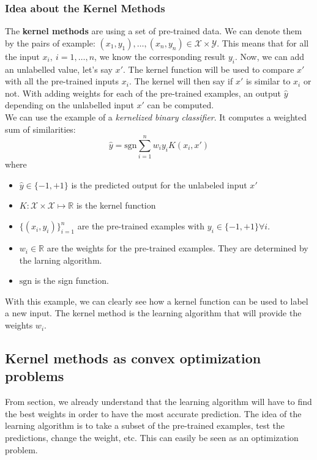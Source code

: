\documentclass[a4paper, 11pt]{article}
\begin{document}
\subsubsection{Idea about the Kernel Methods}
\label{subsub:meth}
The {\bf kernel methods} are using a set of pre-trained data. We can denote them by the pairs of example: $(x_1, y_1), \ldots, (x_n,y_n) \in \mathcal{X} \times \mathcal{Y}$. This means that for all the input $x_i, ~ i=1,\ldots,n$, we know the corresponding result $y_i$. Now, we can add an unlabelled value, let's say $x'$. The kernel function will be used to compare $x'$ with all the pre-trained inputs $x_i$. The kernel will then say if $x'$ is similar to $x_i$ or not. With adding weights for each of the pre-trained examples, an output $\hat{y}$ depending on the unlabelled input $x'$ can be computed. 
\\ 
We can use the example of a {\it kernelized binary classifier}. It computes a weighted sum of similarities:
\begin{equation}
\hat{y} = \text{sgn}\sum_{i=1}^{n }w_i y_i K(x_i,x')
\end{equation}
where
\begin{itemize}
\item $\hat{y}\in\{-1,+1\}$ is the predicted output for the unlabeled input $x'$
\item $K: \mathcal{X}\times\mathcal{X} \mapsto \mathbb{R}$ is the kernel function
\item $\{(x_i, y_i)\}_{i=1}^{n}$ are the pre-trained examples with $y_i\in\{-1,+1\}\forall i$.
\item $w_i\in \mathbb{R}$ are the weights for the pre-trained examples. They are determined by the larning algorithm.
\item $\text{sgn}$ is the sign function.
\end{itemize}
With this example, we can clearly see how a kernel function can be used to label a new input. The kernel method is the learning algorithm that will provide the weights $w_i$.

\subsection{Kernel methods as convex optimization problems}

From section, we already understand that the learning algorithm will have to find the best weights in order to have the most accurate prediction. The idea of the learning algorithm is to take a subset of the pre-trained examples, test the predictions, change the weight, etc. This can easily be seen as an optimization problem.  
\\\\
\end{document}
